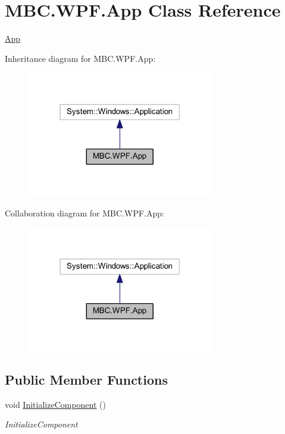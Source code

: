 \hypertarget{class_m_b_c_1_1_w_p_f_1_1_app}{\section{M\-B\-C.\-W\-P\-F.\-App Class Reference}
\label{class_m_b_c_1_1_w_p_f_1_1_app}
}


\hyperlink{class_m_b_c_1_1_w_p_f_1_1_app}{App}  




Inheritance diagram for M\-B\-C.\-W\-P\-F.\-App\-:
\nopagebreak
\begin{figure}[H]
\begin{center}
\leavevmode
\includegraphics[width=230pt]{class_m_b_c_1_1_w_p_f_1_1_app__inherit__graph}
\end{center}
\end{figure}


Collaboration diagram for M\-B\-C.\-W\-P\-F.\-App\-:
\nopagebreak
\begin{figure}[H]
\begin{center}
\leavevmode
\includegraphics[width=230pt]{class_m_b_c_1_1_w_p_f_1_1_app__coll__graph}
\end{center}
\end{figure}
\subsection*{Public Member Functions}
\begin{DoxyCompactItemize}
\item 
void \hyperlink{class_m_b_c_1_1_w_p_f_1_1_app_a64e84c389e5f4a2e06725318efe701da}{Initialize\-Component} ()
\begin{DoxyCompactList}\small\item\em Initialize\-Component \end{DoxyCompactList}\end{DoxyCompactItemize}
